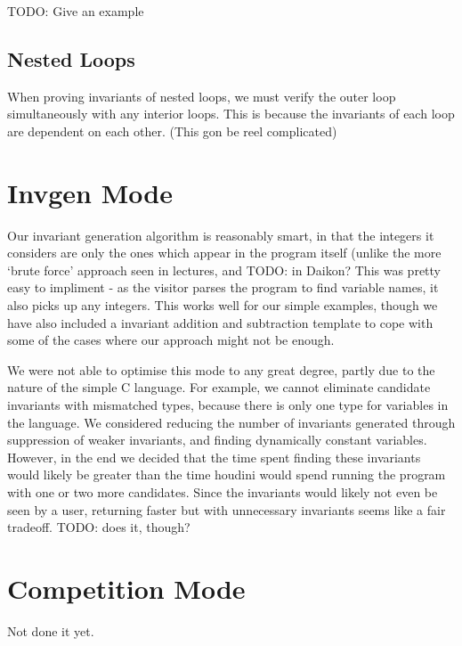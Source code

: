 \documentclass[11pt]{article}
\begin{document}
TODO: Give an example

\subsection{Nested Loops}

When proving invariants of nested loops, we must verify the outer loop simultaneously with any interior loops. This is because the invariants of each loop are dependent on each other. (This gon be reel complicated)

\section{Invgen Mode}

Our invariant generation algorithm is reasonably smart, in that the integers it considers are only the ones which appear in the program itself (unlike the more `brute force' approach seen in lectures, and TODO: in Daikon? This was pretty easy to impliment - as the visitor parses the program to find variable names, it also picks up any integers. This works well for our simple examples, though we have also included a invariant addition and subtraction template to cope with some of the cases where our approach might not be enough.

We were not able to optimise this mode to any great degree, partly due to the nature of the simple C language. For example, we cannot eliminate candidate invariants with mismatched types, because there is only one type for variables in the language. We considered reducing the number of invariants generated through suppression of weaker invariants, and finding dynamically constant variables. However, in the end we decided that the time spent finding these invariants would likely be greater than the time houdini would spend running the program with one or two more candidates. Since the invariants would likely not even be seen by a user, returning faster but with unnecessary invariants seems like a fair tradeoff. TODO: does it, though?

\section{Competition Mode}

Not done it yet.
\end{document}
